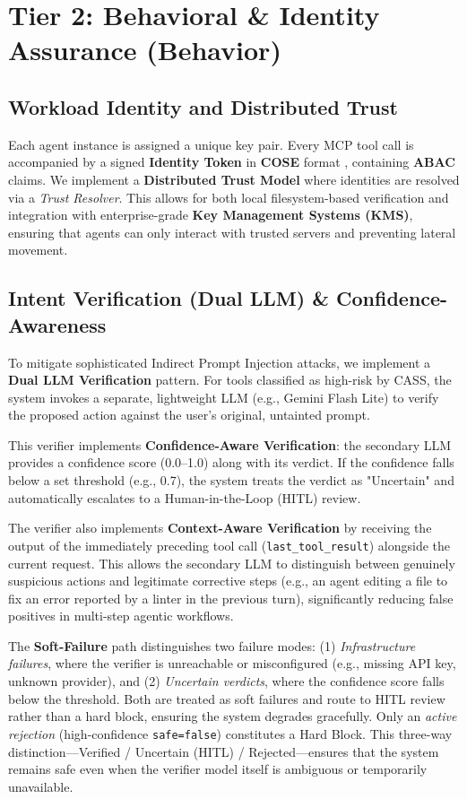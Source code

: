 \documentclass[conference]{IEEEtran}
\begin{document}
\section{Tier 2: Behavioral \& Identity Assurance (Behavior)}
\subsection{Workload Identity and Distributed Trust}
Each agent instance is assigned a unique key pair. Every MCP tool call is accompanied by a signed \textbf{Identity Token} in \textbf{COSE} format \cite{rfc9052}, containing \textbf{ABAC} claims. We implement a \textbf{Distributed Trust Model} where identities are resolved via a \textit{Trust Resolver}. This allows for both local filesystem-based verification and integration with enterprise-grade \textbf{Key Management Systems (KMS)}, ensuring that agents can only interact with trusted servers and preventing lateral movement.

\subsection{Intent Verification (Dual LLM) \& Confidence-Awareness}
To mitigate sophisticated Indirect Prompt Injection attacks, we implement a \textbf{Dual LLM Verification} pattern. For tools classified as high-risk by CASS, the system invokes a separate, lightweight LLM (e.g., Gemini Flash Lite) to verify the proposed action against the user's original, untainted prompt. 

This verifier implements \textbf{Confidence-Aware Verification}: the secondary LLM provides a confidence score (0.0--1.0) along with its verdict. If the confidence falls below a set threshold (e.g., 0.7), the system treats the verdict as "Uncertain" and automatically escalates to a Human-in-the-Loop (HITL) review.

The verifier also implements \textbf{Context-Aware Verification} by receiving the output of the immediately preceding tool call (\texttt{last\_tool\_result}) alongside the current request. This allows the secondary LLM to distinguish between genuinely suspicious actions and legitimate corrective steps (e.g., an agent editing a file to fix an error reported by a linter in the previous turn), significantly reducing false positives in multi-step agentic workflows.

The \textbf{Soft-Failure} path distinguishes two failure modes: (1) \textit{Infrastructure failures}, where the verifier is unreachable or misconfigured (e.g., missing API key, unknown provider), and (2) \textit{Uncertain verdicts}, where the confidence score falls below the threshold. Both are treated as soft failures and route to HITL review rather than a hard block, ensuring the system degrades gracefully. Only an \textit{active rejection} (high-confidence \texttt{safe=false}) constitutes a Hard Block. This three-way distinction---Verified / Uncertain (HITL) / Rejected---ensures that the system remains safe even when the verifier model itself is ambiguous or temporarily unavailable.
\end{document}
